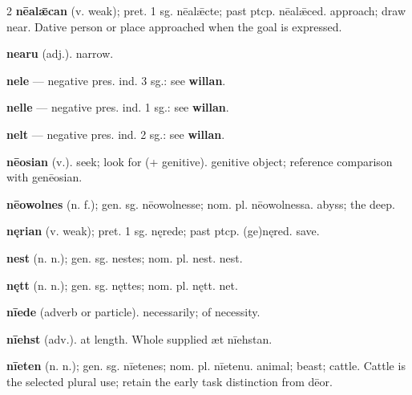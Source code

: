 \begin{multicols*}{2}
\textbf{nēalǣcan} (v. weak); pret. 1 sg. nēalǣcte; past ptcp. nēalǣced. approach; draw near. Dative person or place approached when the goal is expressed.\par
\textbf{nearu} (adj.). narrow.\par
\textbf{nele} — negative pres. ind. 3 sg.: see \textbf{willan}.\par
\textbf{nelle} — negative pres. ind. 1 sg.: see \textbf{willan}.\par
\textbf{nelt} — negative pres. ind. 2 sg.: see \textbf{willan}.\par
\textbf{nēosian} (v.). seek; look for (+ genitive). genitive object; reference comparison with genēosian.\par
\textbf{nēowolnes} (n. f.); gen. sg. nēowolnesse; nom. pl. nēowolnessa. abyss; the deep.\par
\textbf{nęrian} (v. weak); pret. 1 sg. nęrede; past ptcp. (ge)nęred. save.\par
\textbf{nest} (n. n.); gen. sg. nestes; nom. pl. nest. nest.\par
\textbf{nętt} (n. n.); gen. sg. nęttes; nom. pl. nętt. net.\par
\textbf{nīede} (adverb or particle). necessarily; of necessity.\par
\textbf{nīehst} (adv.). at length. Whole supplied æt nīehstan.\par
\textbf{nīeten} (n. n.); gen. sg. nīetenes; nom. pl. nīetenu. animal; beast; cattle. Cattle is the selected plural use; retain the early task distinction from dēor.\par

\end{multicols*}
